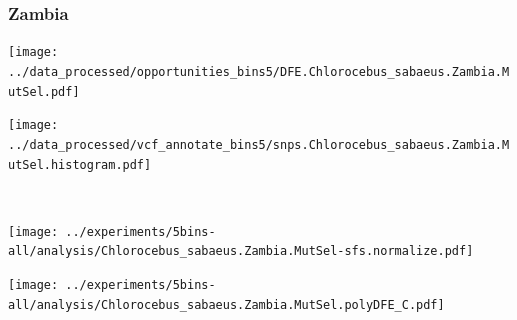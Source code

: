 \subsubsection{Zambia}

\begin{minipage}{0.49\linewidth}
    \texttt{[image: ../data\_processed/opportunities\_bins5/DFE.Chlorocebus\_sabaeus.Zambia.MutSel.pdf]}
\end{minipage}
\begin{minipage}{0.49\linewidth}
    \texttt{[image: ../data\_processed/vcf\_annotate\_bins5/snps.Chlorocebus\_sabaeus.Zambia.MutSel.histogram.pdf]}
\end{minipage}
\\
\begin{minipage}{0.49\linewidth}
    \texttt{[image: ../experiments/5bins-all/analysis/Chlorocebus\_sabaeus.Zambia.MutSel-sfs.normalize.pdf]}
\end{minipage}
\begin{minipage}{0.4\linewidth}
    \texttt{[image: ../experiments/5bins-all/analysis/Chlorocebus\_sabaeus.Zambia.MutSel.polyDFE\_C.pdf]}
\end{minipage}
